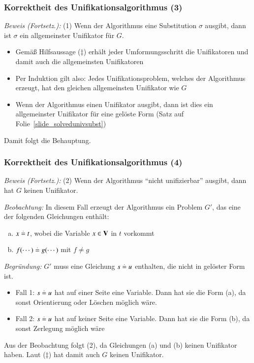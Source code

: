 \documentclass[aspectratio=1610,onlymath]{beamer}
\begin{document}
\begin{frame}[t]\frametitle{Korrektheit des Unifikationsalgorithmus (3)}


\emph{Beweis (Fortsetz.):} (1) Wenn der Algorithmus eine Substitution $\sigma$ ausgibt, dann ist $\sigma$ ein allgemeinster Unifikator für $G$.
\smallskip\pause

\begin{itemize}
\item Gemäß Hilfsaussage ($\ddagger$) erhält jeder Umformungsschritt die Unifikatoren und damit auch die allgemeinsten Unifikatoren\pause
\item Per Induktion gilt also: Jedes Unifikationsproblem, welches der Algorithmus erzeugt, hat den gleichen allgemeinsten Unifikator wie $G$\pause
\item Wenn der Algorithmus einen Unifikator ausgibt, dann ist dies ein allgemeinster Unifikator für eine gelöste Form (Satz auf Folie~\ref{slide_solvedunivsubst})
\end{itemize}
Damit folgt die Behauptung.

\end{frame}

\begin{frame}[t]\frametitle{Korrektheit des Unifikationsalgorithmus (4)}


\emph{Beweis (Fortsetz.):} (2) Wenn der Algorithmus "`nicht unifizierbar"' ausgibt, dann hat $G$ keinen Unifikator.
\smallskip\pause

\emph{Beobachtung:} In diesem Fall erzeugt der Algorithmus ein Problem $G'$, das eine der folgenden Gleichungen enthält:
\begin{enumerate}[(a)]
\item $x\stackrel{.}{=} t$, wobei die Variable $x\in\textbf{\textcolor{black}{V}}$ in $t$ vorkommt
\item $f(\cdots)\stackrel{.}{=} g(\cdots)$ mit $f\neq g$
\end{enumerate}
\pause\emph{Begründung:} $G'$ muss eine Gleichung $s\stackrel{.}{=} u$ enthalten, die nicht in gelöster Form ist.
\begin{itemize}
\item Fall 1: $s\stackrel{.}{=} u$ hat auf einer Seite eine Variable. Dann hat sie die Form (a), da sonst Orientierung oder Löschen möglich wäre.
\item Fall 2: $s\stackrel{.}{=} u$ hat auf keiner Seite eine Variable. Dann hat sie die Form (b), da sonst Zerlegung möglich wäre
\end{itemize}
\pause Aus der Beobachtung folgt (2), da Gleichungen (a) und (b) keinen Unifikator haben.
Laut ($\ddagger$) hat damit auch $G$ keinen Unifikator.


\end{frame}
\end{document}
